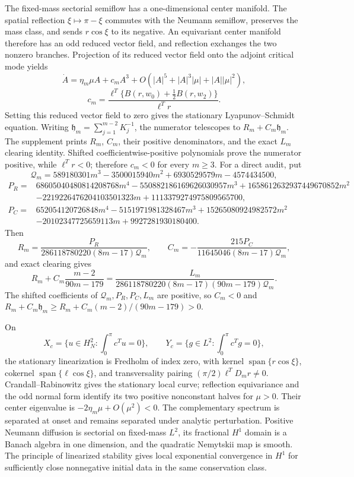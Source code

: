 \documentclass[10pt]{article}
\begin{document}
The fixed-mass sectorial semiflow has a one-dimensional center manifold.
The spatial reflection $\xi\mapsto\pi-\xi$ commutes with the Neumann
semiflow, preserves the mass class, and sends $r\cos\xi$ to its negative.
An equivariant center manifold therefore has an odd reduced vector field, and
reflection exchanges the two nonzero branches.
Projection of its reduced vector field onto the adjoint critical mode yields
\[
\dot A=\eta_m\mu A+c_mA^3+O(|A|^5+|A|^3|\mu|+|A||\mu|^2),
\]
\[
c_m=\frac{\ell^T\{B(r,w_0)+\tfrac12B(r,w_2)\}}{\ell^Tr}.
\]
Setting this reduced vector field to zero gives the stationary
Lyapunov--Schmidt equation.
Writing $\mathfrak h_m=\sum_{j=1}^{m-2}K_j^{-1}$, the numerator telescopes to
$R_m+C_m\mathfrak h_m$.  The supplement prints $R_m$, $C_m$, their positive
denominators, and the exact $L_m$ clearing identity.  Shifted
coefficientwise-positive polynomials prove the numerator positive, while
$\ell^Tr<0$; therefore $c_m<0$ for every $m\ge3$.
For a direct audit, put
\[
\mathcal Q_m=589180301m^3-3500015940m^2+6930529579m-4574434500,
\]
\begin{align*}
P_R={}&68605040480814208768m^4-550882186169626030957m^3
+1658612632937449670852m^2\\
&-2219226476204103501323m+1113379274975809565700,\\
P_C={}&652054120726848m^4-5151971981328467m^3
+15265080924982572m^2\\
&-20102347725659113m+9927281930180400.
\end{align*}
Then
\[
R_m=\frac{P_R}{286118780220(8m-17)\mathcal Q_m},\qquad
C_m=-\frac{215P_C}{11645046(8m-17)\mathcal Q_m},
\]
and exact clearing gives
\[
R_m+C_m\frac{m-2}{90m-179}
=\frac{L_m}{286118780220(8m-17)(90m-179)\mathcal Q_m}.
\]
The shifted coefficients of $\mathcal Q_m,P_R,P_C,L_m$ are positive, so
$C_m<0$ and
$R_m+C_m\mathfrak h_m\ge R_m+C_m(m-2)/(90m-179)>0$.

On
\[
 X_c=\{u\in H_N^2:\textstyle\int_0^\pi c^Tu=0\},\qquad
 Y_c=\{g\in L^2:\textstyle\int_0^\pi c^Tg=0\},
\]
the stationary linearization is Fredholm of index zero, with kernel
$\operatorname{span}\{r\cos\xi\}$, cokernel
$\operatorname{span}\{\ell\cos\xi\}$, and transversality pairing
$(\pi/2)\ell^TD_mr\ne0$.  Crandall--Rabinowitz gives the stationary local curve; reflection equivariance
and the odd normal form identify its two positive nonconstant halves for
$\mu>0$. Their center eigenvalue is $-2\eta_m\mu+O(\mu^2)<0$. The complementary spectrum is separated at onset and remains separated under analytic perturbation. Positive Neumann diffusion is sectorial on fixed-mass $L^2$, its fractional $H^1$ domain is a Banach algebra in one dimension, and the quadratic Nemytskii map is smooth. The principle of linearized stability gives local exponential convergence in $H^1$ for sufficiently close nonnegative initial data in the same conservation class.
\end{document}
